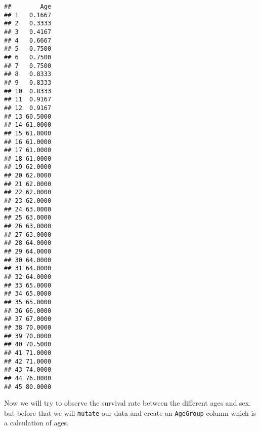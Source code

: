 \documentclass[]{article}
\newenvironment{Shaded}{\begin{snugshade}}{\end{snugshade}}
\newcommand{\CommentTok}[1]{\textcolor[rgb]{0.56,0.35,0.01}{\textit{#1}}}
\newcommand{\DataTypeTok}[1]{\textcolor[rgb]{0.13,0.29,0.53}{#1}}
\newcommand{\DecValTok}[1]{\textcolor[rgb]{0.00,0.00,0.81}{#1}}
\newcommand{\KeywordTok}[1]{\textcolor[rgb]{0.13,0.29,0.53}{\textbf{#1}}}
\newcommand{\NormalTok}[1]{#1}
\newcommand{\OperatorTok}[1]{\textcolor[rgb]{0.81,0.36,0.00}{\textbf{#1}}}
\newcommand{\OtherTok}[1]{\textcolor[rgb]{0.56,0.35,0.01}{#1}}
\newcommand{\StringTok}[1]{\textcolor[rgb]{0.31,0.60,0.02}{#1}}
\begin{document}
\begin{Shaded}
\end{Shaded}

\begin{verbatim}
##        Age
## 1   0.1667
## 2   0.3333
## 3   0.4167
## 4   0.6667
## 5   0.7500
## 6   0.7500
## 7   0.7500
## 8   0.8333
## 9   0.8333
## 10  0.8333
## 11  0.9167
## 12  0.9167
## 13 60.5000
## 14 61.0000
## 15 61.0000
## 16 61.0000
## 17 61.0000
## 18 61.0000
## 19 62.0000
## 20 62.0000
## 21 62.0000
## 22 62.0000
## 23 62.0000
## 24 63.0000
## 25 63.0000
## 26 63.0000
## 27 63.0000
## 28 64.0000
## 29 64.0000
## 30 64.0000
## 31 64.0000
## 32 64.0000
## 33 65.0000
## 34 65.0000
## 35 65.0000
## 36 66.0000
## 37 67.0000
## 38 70.0000
## 39 70.0000
## 40 70.5000
## 41 71.0000
## 42 71.0000
## 43 74.0000
## 44 76.0000
## 45 80.0000
\end{verbatim}

Now we will try to observe the survival rate between the different ages
and sex. but before that we will \texttt{mutate} our data and create an
\texttt{AgeGroup} column which is a calculation of ages.

\begin{Shaded}
\end{Shaded}
\end{document}

